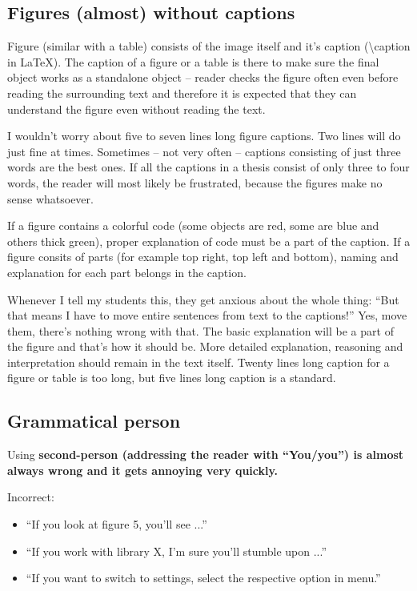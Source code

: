 {{\subsection*{Figures (almost) without captions}

Figure (similar with a table) consists of the image itself and it's caption (\textbackslash caption in LaTeX). The caption of a figure or a table is there to make sure the final object works as a standalone object -- reader checks the figure often even before reading the surrounding text and therefore it is expected that they can understand the figure even without reading the text.

I wouldn't worry about five to seven lines long figure captions. Two lines will do just fine at times. Sometimes -- not very often -- captions consisting of just three words are the best ones. If all the captions in a thesis consist of only three to four words, the reader will most likely be frustrated, because the figures make no sense whatsoever.

If a figure contains a colorful code (some objects are red, some are blue and others thick green), proper explanation of code must be a part of the caption. If a figure consits of parts (for example top right, top left and bottom), naming and explanation for each part belongs in the caption.

Whenever I tell my students this, they get anxious about the whole thing: ``But that means I have to move entire sentences from text to the captions!'' Yes, move them, there's nothing wrong with that. The basic explanation will be a part of the figure and that's how it should be. More detailed explanation, reasoning and interpretation should remain in the text itself. Twenty lines long caption for a figure or table is too long, but five lines long caption is a standard.


\subsection*{Grammatical person}

Using \bf second-person \rm (addressing the reader with ``You/you'') is almost always wrong and it gets annoying very quickly.

Incorrect:
\begin{itemize}
  \item{``If you look at figure 5, you'll see ...''}
  \item{``If you work with library X, I'm sure you'll stumble upon ...''}
  \item{``If you want to switch to settings, select the respective option in menu.''}
\end{itemize}

}}
